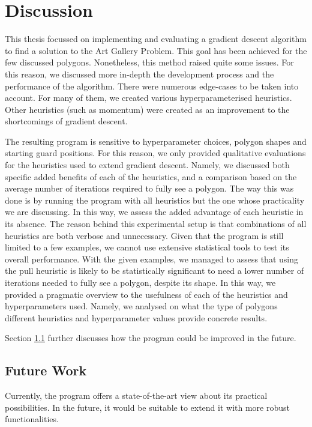 \section{Discussion}
This thesis focussed on implementing and evaluating a gradient descent algorithm to find a solution to the Art Gallery Problem. This goal has been achieved for the few discussed polygons. 
Nonetheless, this method raised quite some issues. For this reason, we discussed more in-depth the development process and the performance of the algorithm. There were numerous edge-cases to be taken into account. For many of them, we created various hyperparameterised heuristics. Other heuristics (such as momentum) were created as an improvement to the shortcomings of gradient descent.

The resulting program is sensitive to hyperparameter choices, polygon shapes and starting guard positions. For this reason, we only provided qualitative evaluations for the heuristics used to extend gradient descent. Namely, we discussed both specific added benefits of each of the heuristics, and a comparison based on the average number of iterations required to fully see a polygon. The way this was done is by running the program with all heuristics but the one whose practicality we are discussing. In this way, we assess the added advantage of each heuristic in its absence. The reason behind this experimental setup is that combinations of all heuristics are both verbose and unnecessary. Given that the program is still limited to a few examples, we cannot use extensive statistical tools to test its overall performance. With the given examples, we managed to assess that using the pull heuristic is likely to be statistically significant to need a lower number of iterations needed to fully see a polygon, despite its shape.
In this way, we provided a pragmatic overview to the usefulness of each of the heuristics and hyperparameters used. Namely, we analysed on what the type of polygons different heuristics and hyperparameter values provide concrete results.

Section \ref{sec:future} further discusses how the program could be improved in the future.




\subsection{Future Work}
\label{sec:future}
Currently, the program offers a state-of-the-art view about its practical possibilities.
In the future, it would be suitable to extend it with more robust functionalities.

